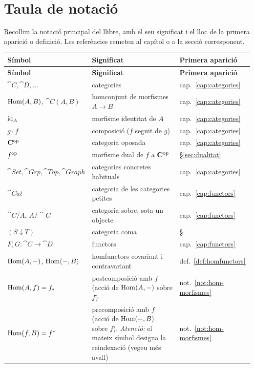 \chapter*{Taula de notació}

Recollim la notació principal del llibre, amb el seu significat i el lloc de la primera aparició o definició. Les referències remeten al capítol o a la secció corresponent.

\medskip
\renewcommand{\arraystretch}{1.25}
\begin{xltabular}{\linewidth}{@{}l >{\raggedright\arraybackslash}X l@{}}
\hline
\textbf{Símbol} & \textbf{Significat} & \textbf{Primera aparició}\\
\hline
\endfirsthead
\hline
\textbf{Símbol} & \textbf{Significat} & \textbf{Primera aparició}\\
\hline
\endhead
\hline
\endfoot
\endlastfoot
$\cat{C},\cat{D},\dots$ & categories & cap.~\ref{cap:categories}\\
$\operatorname{Hom}(A,B)$, $\cat{C}(A,B)$ & homconjunt de morfismes $A\to B$ & cap.~\ref{cap:categories}\\
$\operatorname{id}_A$ & morfisme identitat de $A$ & cap.~\ref{cap:categories}\\
$g\comp f$ & composició ($f$ seguit de $g$) & cap.~\ref{cap:categories}\\
$\mathbf{C}^{\mathrm{op}}$ & categoria oposada & cap.~\ref{cap:categories}\\
$f^{\mathrm{op}}$ & morfisme dual de $f$ a $\mathbf{C}^{\mathrm{op}}$ & \S\ref{sec:dualitat}\\
$\cat{Set},\cat{Grp},\cat{Top},\cat{Graph}$ & categories concretes habituals & cap.~\ref{cap:categories}\\
$\cat{Cat}$ & categoria de les categories petites & cap.~\ref{cap:functors}\\
$\cat{C}/A$, $A/\cat{C}$ & categoria sobre, sota un objecte & cap.~\ref{cap:functors}\\
$(S\downarrow T)$ & categoria coma & \S{}\\
$F,G\colon\cat{C}\to\cat{D}$ & functors & cap.~\ref{cap:functors}\\
$\operatorname{Hom}(A,-)$, $\operatorname{Hom}(-,B)$ & homfunctors covariant i contravariant & def.~\ref{def:homfunctors}\\
$\operatorname{Hom}(A,f)=f_*$ & postcomposició amb $f$ (acció de $\operatorname{Hom}(A,-)$ sobre $f$) & not.~\ref{not:hom-morfismes}\\
$\operatorname{Hom}(f,B)=f^*$ & precomposició amb $f$ (acció de $\operatorname{Hom}(-,B)$ sobre $f$). \emph{Atenció:} el mateix símbol designa la reindexació (vegeu més avall) & not.~\ref{not:hom-morfismes}\\

\end{xltabular}
